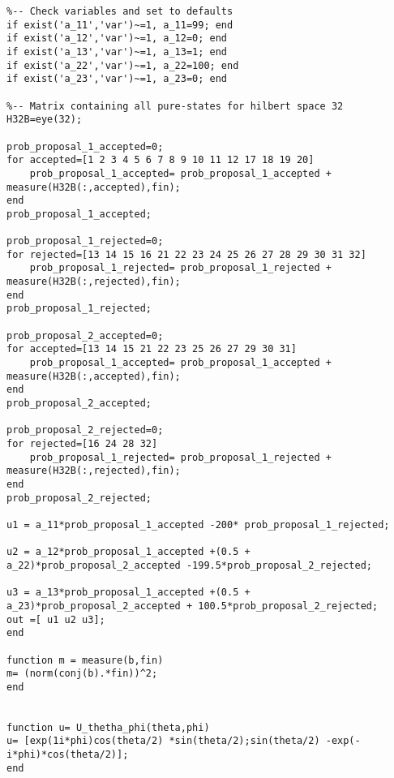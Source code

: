 \begin{lstlisting}
%-- Check variables and set to defaults
if exist('a_11','var')~=1, a_11=99; end
if exist('a_12','var')~=1, a_12=0; end
if exist('a_13','var')~=1, a_13=1; end
if exist('a_22','var')~=1, a_22=100; end
if exist('a_23','var')~=1, a_23=0; end

%-- Matrix containing all pure-states for hilbert space 32
H32B=eye(32);

prob_proposal_1_accepted=0;
for accepted=[1 2 3 4 5 6 7 8 9 10 11 12 17 18 19 20]
    prob_proposal_1_accepted= prob_proposal_1_accepted + measure(H32B(:,accepted),fin);
end
prob_proposal_1_accepted;

prob_proposal_1_rejected=0;
for rejected=[13 14 15 16 21 22 23 24 25 26 27 28 29 30 31 32]
    prob_proposal_1_rejected= prob_proposal_1_rejected + measure(H32B(:,rejected),fin);
end
prob_proposal_1_rejected;

prob_proposal_2_accepted=0;
for accepted=[13 14 15 21 22 23 25 26 27 29 30 31]
    prob_proposal_1_accepted= prob_proposal_1_accepted + measure(H32B(:,accepted),fin);
end
prob_proposal_2_accepted;

prob_proposal_2_rejected=0;
for rejected=[16 24 28 32]
    prob_proposal_1_rejected= prob_proposal_1_rejected + measure(H32B(:,rejected),fin);
end
prob_proposal_2_rejected;

u1 = a_11*prob_proposal_1_accepted -200* prob_proposal_1_rejected;

u2 = a_12*prob_proposal_1_accepted +(0.5 + a_22)*prob_proposal_2_accepted -199.5*prob_proposal_2_rejected;

u3 = a_13*prob_proposal_1_accepted +(0.5 + a_23)*prob_proposal_2_accepted + 100.5*prob_proposal_2_rejected;
out =[ u1 u2 u3];
end

function m = measure(b,fin)
m= (norm(conj(b).*fin))^2;
end


function u= U_thetha_phi(theta,phi)
u= [exp(1i*phi)cos(theta/2) *sin(theta/2);sin(theta/2) -exp(-i*phi)*cos(theta/2)];
end
\end{lstlisting}

